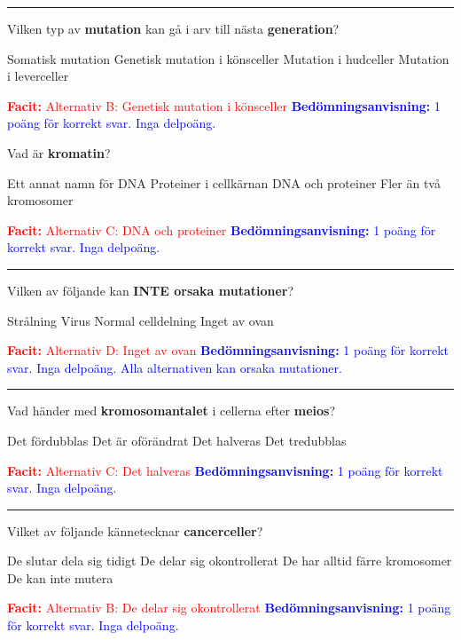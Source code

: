\documentclass{exam}
\newcommand{\facit}[1]{\textcolor{red}{\textbf{Facit:} #1}}
\newcommand{\bedomning}[1]{\textcolor{blue}{\textbf{Bedömningsanvisning:} #1}}
\begin{document}
\begin{questions}
\vspace{5mm}\hrule\vspace{5mm}

\question Vilken typ av \textbf{mutation} kan gå i arv till nästa \textbf{generation}?
\begin{checkboxes}
   \choice Somatisk mutation
   \correctchoice Genetisk mutation i könsceller
   \choice Mutation i hudceller
   \choice Mutation i leverceller
\end{checkboxes}
\facit{Alternativ B: Genetisk mutation i könsceller}
\bedomning{1 poäng för korrekt svar. Inga delpoäng.}

\break

\question Vad är \textbf{kromatin}?
\begin{checkboxes}
   \choice Ett annat namn för DNA
   \choice Proteiner i cellkärnan
   \correctchoice DNA och proteiner
   \choice Fler än två kromosomer
\end{checkboxes}
\facit{Alternativ C: DNA och proteiner}
\bedomning{1 poäng för korrekt svar. Inga delpoäng.}

\vspace{5mm}\hrule\vspace{5mm}

\question Vilken av följande kan \textbf{INTE orsaka mutationer}?
\begin{checkboxes}
   \choice Strålning
   \choice Virus
   \choice Normal celldelning
   \correctchoice Inget av ovan
\end{checkboxes}
\facit{Alternativ D: Inget av ovan}
\bedomning{1 poäng för korrekt svar. Inga delpoäng. Alla alternativen kan orsaka mutationer.}

\vspace{5mm}\hrule\vspace{5mm}


\question Vad händer med \textbf{kromosomantalet} i cellerna efter \textbf{meios}?
\begin{checkboxes}
   \choice Det fördubblas
   \choice Det är oförändrat
   \correctchoice Det halveras
   \choice Det tredubblas
\end{checkboxes}
\facit{Alternativ C: Det halveras}
\bedomning{1 poäng för korrekt svar. Inga delpoäng.}

\vspace{5mm}\hrule\vspace{5mm}

\question Vilket av följande kännetecknar \textbf{cancerceller}?
\begin{checkboxes}
   \choice De slutar dela sig tidigt
   \correctchoice De delar sig okontrollerat
   \choice De har alltid färre kromosomer
   \choice De kan inte mutera
\end{checkboxes}
\facit{Alternativ B: De delar sig okontrollerat}
\bedomning{1 poäng för korrekt svar. Inga delpoäng.}


\end{questions}
\end{document}
